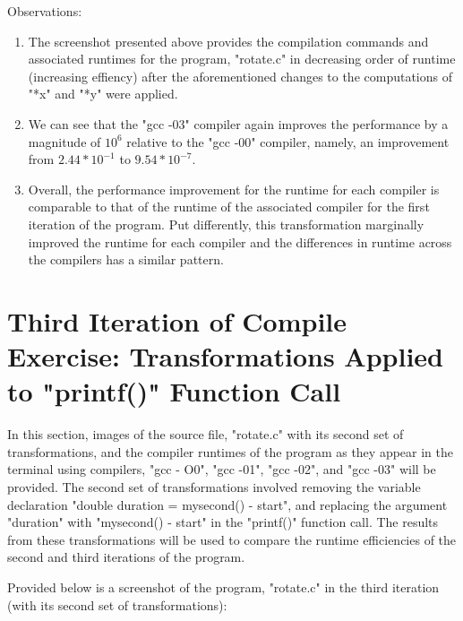\documentclass{article}
\begin{document}

Observations:
\begin{enumerate}
    \label{sec:math}
    \item The screenshot presented above provides the compilation commands and associated runtimes for the program, "rotate.c" in decreasing order of runtime (increasing effiency) after the aforementioned changes to the computations of "*x" and "*y" were applied. 
    \item We can see that the "gcc -03" compiler again improves the performance by a magnitude of $10^{6}$ relative to the "gcc -00" compiler, namely, an improvement from $2.44 * 10^{-1}$ to $9.54 * 10^{-7}$. 
    \item Overall, the performance improvement for the runtime for each compiler is comparable to that of the runtime of the associated compiler for the first iteration of the program. Put differently, this transformation marginally improved the runtime for each compiler and the differences in runtime across the compilers has a similar pattern. 

\end{enumerate}
\pagebreak


\section{Third Iteration of Compile Exercise: Transformations Applied to "printf()" Function Call}

In this section, images of the source file, "rotate.c" with its second set of transformations, and the compiler runtimes of the program as they appear in the terminal using compilers, "gcc - O0", "gcc -01", "gcc -02", and "gcc -03" will be provided. The second set of transformations involved removing the variable declaration "double duration = mysecond() - start", and replacing the argument "duration" with "mysecond() - start" in the "printf()" function call. The results from these transformations will be used to compare the runtime efficiencies of the second and third iterations of the program.

Provided below is a screenshot of the program, "rotate.c" in the third iteration (with its second set of transformations):
\end{document}
